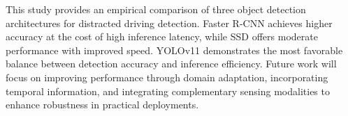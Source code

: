 \documentclass[conference]{IEEEtran}
\begin{document}


This study provides an empirical comparison of three object detection architectures for distracted driving detection. Faster R-CNN achieves higher accuracy at the cost of high inference latency, while SSD offers moderate performance with improved speed. YOLOv11 demonstrates the most favorable balance between detection accuracy and inference efficiency. Future work will focus on improving performance through domain adaptation, incorporating temporal information, and integrating complementary sensing modalities to enhance robustness in practical deployments.
\end{document}
